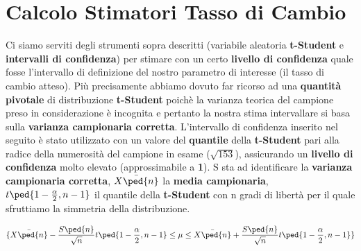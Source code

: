   \chapter{Calcolo Stimatori Tasso di Cambio}
	Ci siamo serviti degli strumenti sopra descritti (variabile aleatoria \textbf{t-Student} e \textbf{intervalli di confidenza}) per stimare con un certo \textbf{livello di confidenza} quale fosse l'intervallo di definizione del nostro parametro di interesse (il tasso di cambio atteso). Più precisamente abbiamo dovuto far ricorso ad una \textbf{quantità pivotale} di distribuzione \textbf{t-Student} poichè la varianza teorica del campione preso in considerazione è incognita e pertanto la nostra stima intervallare si basa sulla \textbf{varianza campionaria corretta}. L'intervallo di confidenza inserito nel seguito è stato utilizzato con un valore del \textbf{quantile} della \textbf{t-Student} pari alla radice della numerosità del campione in esame ($\sqrt{153}$), assicurando un \textbf{livello di confidenza} molto elevato (approssimabile a \textbf{1}). S sta ad identificare la \textbf{varianza campionaria corretta}, $\bar{X\ped{n}}$ la \textbf{media campionaria}, $t\ped{1-\frac{\alpha}{2},n-1}$ il quantile della \textbf{t-Student} con n gradi di libertà per il quale sfruttiamo la simmetria della distribuzione.

\[
\{\bar{X\ped{n}} - \frac{S\ped{n}}{\sqrt{n}}t\ped{1-\frac{\alpha}{2},n-1} \leq \mu \leq \bar{X\ped{n}} + \frac{S\ped{n}}{\sqrt{n}}t\ped{1-\frac{\alpha}{2},n-1}\}
\]  
  
    \label{sec:stimatori_tasso_cambio}